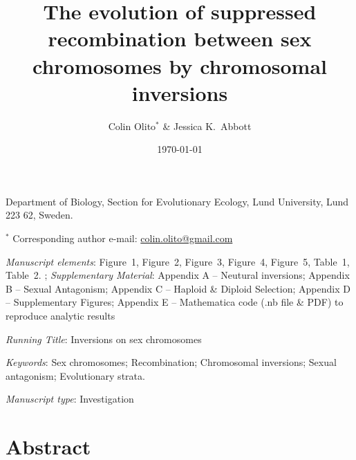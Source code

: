 \documentclass{article}
\title{The evolution of suppressed recombination between sex chromosomes by chromosomal inversions}
\author{Colin Olito$^{\ast}$ \& Jessica K.~Abbott}
\date{\today}
\begin{document}
\maketitle

\noindent{} Department of Biology, Section for Evolutionary Ecology, Lund University, Lund 223 62, Sweden.

\noindent{} $^{\ast}$ Corresponding author e-mail: \url{colin.olito@gmail.com}

\bigskip

\noindent{} \textit{Manuscript elements}: Figure~1, Figure~2, Figure~3, Figure~4, Figure~5, Table~1, Table~2.  ; {\itshape Supplementary Material}: Appendix A -- Neutural inversions; Appendix B -- Sexual Antagonism; Appendix C -- Haploid \& Diploid Selection; Appendix D -- Supplementary Figures; Appendix E -- Mathematica code (.nb file \& PDF) to reproduce analytic results

\bigskip
\noindent{} \textit{Running Title}: Inversions on sex chromosomes

\bigskip

\noindent{} \textit{Keywords}: Sex chromosomes; Recombination; Chromosomal inversions; Sexual antagonism; Evolutionary strata.

\bigskip

\noindent{} \textit{Manuscript type}: Investigation

\bigskip


\linenumbers
\modulolinenumbers[1]
\renewcommand\linenumberfont{\normalfont\small}


\newpage{}
\section*{Abstract}%
\end{document}
